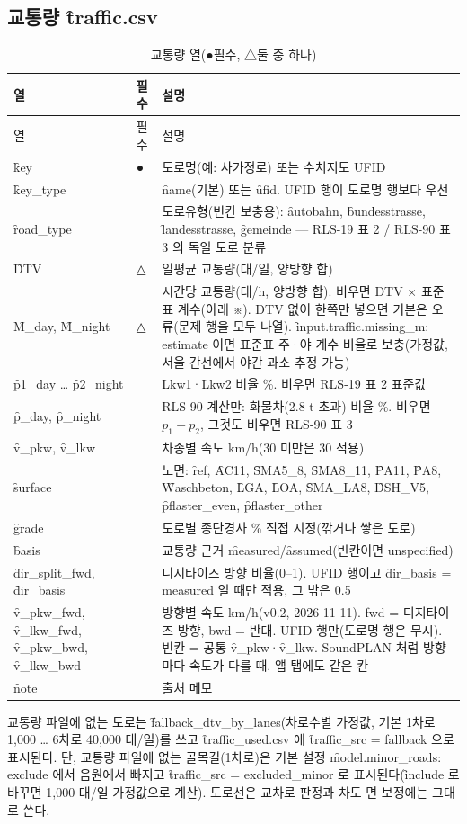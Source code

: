 \documentclass[10.5pt,a4paper]{article}
\begin{document}
\subsection{교통량 \f{traffic.csv}}
\begin{longtable}{P{30mm}P{10mm}P{112mm}}
\caption{교통량 열(●필수, △둘 중 하나)}\label{tab:traffic}\\
\toprule 열 & 필수 & 설명 \\ \midrule\endfirsthead
\toprule 열 & 필수 & 설명 \\ \midrule\endhead
\f{key} & ● & 도로명(예: 사가정로) 또는 수치지도 UFID \\
\f{key\_type} & & \f{name}(기본) 또는 \f{ufid}. UFID 행이 도로명 행보다 우선 \\
\f{road\_type} & & 도로유형(빈칸 보충용): \f{autobahn}, \f{bundesstrasse}, \f{landesstrasse}, \f{gemeinde} — RLS-19 표 2 / RLS-90 표 3 의 독일 도로 분류 \\
\f{DTV} & △ & 일평균 교통량(대/일, 양방향 합) \\
\f{M\_day}, \f{M\_night} & △ & 시간당 교통량(대/h, 양방향 합). 비우면 DTV × 표준표 계수(아래 ※). DTV 없이 한쪽만 넣으면 기본은 오류(문제 행을 모두 나열). \f{input.traffic.missing\_m: estimate} 이면 표준표 주·야 계수 비율로 보충(가정값, 서울 간선에서 야간 과소 추정 가능) \\
\f{p1\_day} … \f{p2\_night} & & Lkw1·Lkw2 비율 \%. 비우면 RLS-19 표 2 표준값 \\
\f{p\_day}, \f{p\_night} & & RLS-90 계산만: 화물차(2.8 t 초과) 비율 \%. 비우면 $p_1 + p_2$, 그것도 비우면 RLS-90 표 3 \\
\f{v\_pkw}, \f{v\_lkw} & & 차종별 속도 km/h(30 미만은 30 적용) \\
\f{surface} & & 노면: \f{ref}, \f{AC11}, \f{SMA5\_8}, \f{SMA8\_11}, \f{PA11}, \f{PA8}, \f{Waschbeton}, \f{LGA}, \f{LOA}, \f{SMA\_LA8}, \f{DSH\_V5}, \f{pflaster\_even}, \f{pflaster\_other} \\
\f{grade} & & 도로별 종단경사 \% 직접 지정(깎거나 쌓은 도로) \\
\f{basis} & & 교통량 근거 \f{measured}/\f{assumed}(빈칸이면 unspecified) \\
\f{dir\_split\_fwd}, \f{dir\_basis} & & 디지타이즈 방향 비율(0–1). UFID 행이고 \f{dir\_basis = measured} 일 때만 적용, 그 밖은 0.5 \\
\f{v\_pkw\_fwd}, \f{v\_lkw\_fwd}, \f{v\_pkw\_bwd}, \f{v\_lkw\_bwd} & & 방향별 속도 km/h(v0.2, 2026-11-11). fwd = 디지타이즈 방향, bwd = 반대. UFID 행만(도로명 행은 무시). 빈칸 = 공통 \f{v\_pkw}·\f{v\_lkw}. SoundPLAN 처럼 방향마다 속도가 다를 때. 앱  탭에도 같은 칸 \\
\f{note} & & 출처 메모 \\
\bottomrule
\end{longtable}
교통량 파일에 없는 도로는 \f{fallback\_dtv\_by\_lanes}(차로수별 가정값, 기본 1차로 1,000 … 6차로 40,000 대/일)를 쓰고 \f{traffic\_used.csv} 에 \f{traffic\_src = fallback} 으로 표시된다. 단, 교통량 파일에 없는 골목길(1차로)은 기본 설정 \f{model.minor\_roads: exclude} 에서 음원에서 빠지고 \f{traffic\_src = excluded\_minor} 로 표시된다(\f{include} 로 바꾸면 1,000 대/일 가정값으로 계산). 도로선은 교차로 판정과 차도 면 보정에는 그대로 쓴다.
\end{document}
